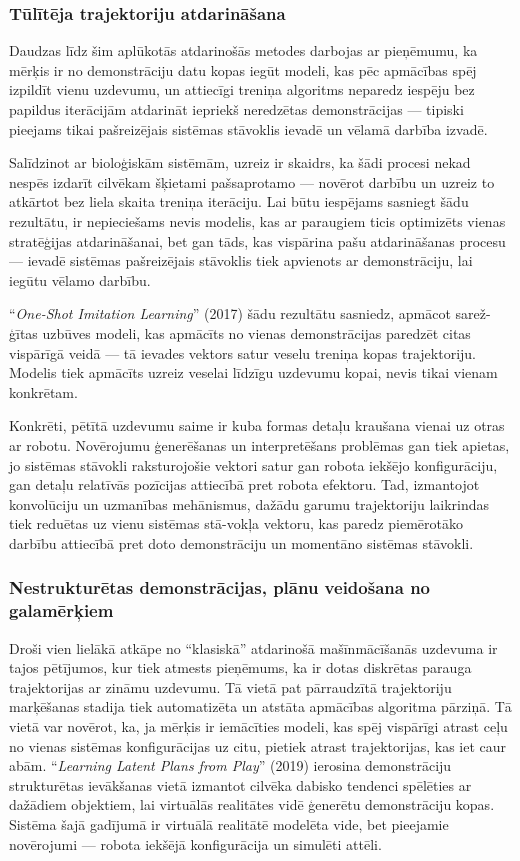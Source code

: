 \documentclass[12pt, a4paper]{article}
\numberwithin{equation}{section} %
\begin{document}
\subsubsection{Tūlītēja trajektoriju atdarināšana}

Daudzas līdz šim aplūkotās atdarinošās metodes darbojas ar pieņēmumu, ka mērķis ir no demonstrāciju datu kopas iegūt modeli, kas pēc apmācības spēj izpildīt vienu uzdevumu, un attiecīgi treniņa algoritms neparedz iespēju bez papildus iterācijām atdarināt iepriekš neredzētas demonstrācijas --- tipiski pieejams tikai pašreizējais sistēmas stāvoklis ievadē un vēlamā darbība izvadē.

Salīdzinot ar bioloģiskām sistēmām, uzreiz ir skaidrs, ka šādi procesi nekad nespēs izdarīt cilvēkam šķietami pašsaprotamo --- novērot darbību un uzreiz to atkārtot bez liela skaita treniņa iterāciju. Lai būtu iespējams sasniegt šādu rezultātu, ir nepieciešams nevis modelis, kas ar paraugiem ticis optimizēts vienas stratēģijas atdarināšanai, bet gan tāds, kas vispārina pašu atdarināšanas procesu --- ievadē sistēmas pašreizējais stāvoklis tiek apvienots ar demonstrāciju, lai iegūtu vēlamo darbību. 

``\textit{One-Shot Imitation Learning}'' \cite{duan2017one} (2017) šādu rezultātu sasniedz, apmācot sarež-ģītas uzbūves modeli, kas apmācīts no vienas demonstrācijas paredzēt citas vispārīgā veidā --- tā ievades vektors satur veselu treniņa kopas trajektoriju. Modelis tiek apmācīts uzreiz veselai līdzīgu uzdevumu kopai, nevis tikai vienam konkrētam.

Konkrēti, pētītā uzdevumu saime ir kuba formas detaļu kraušana vienai uz otras ar robotu. Novērojumu ģenerēšanas un interpretēšans problēmas gan tiek apietas, jo sistēmas stāvokli raksturojošie vektori satur gan robota iekšējo konfigurāciju, gan detaļu relatīvās pozīcijas attiecībā pret robota efektoru. Tad, izmantojot konvolūciju un uzmanības mehānismus, dažādu garumu trajektoriju laikrindas tiek reduētas uz vienu sistēmas stā-vokļa vektoru, kas paredz piemērotāko darbību attiecībā pret doto demonstrāciju un momentāno sistēmas stāvokli.

\subsubsection{Nestrukturētas demonstrācijas, plānu veidošana no galamērķiem}

Droši vien lielākā atkāpe no ``klasiskā'' atdarinošā mašīnmācīšanās uzdevuma ir tajos pētījumos, kur tiek atmests pieņēmums, ka ir dotas diskrētas parauga trajektorijas ar zināmu uzdevumu. Tā vietā pat pārraudzītā trajektoriju marķēšanas stadija tiek automatizēta un atstāta apmācības algoritma pārziņā. Tā vietā var novērot, ka, ja mērķis ir iemācīties modeli, kas spēj vispārīgi atrast ceļu no vienas sistēmas konfigurācijas uz citu, pietiek atrast trajektorijas, kas iet caur abām. ``\textit{Learning Latent Plans from Play}'' \cite{lynch2020learning} (2019) ierosina demonstrāciju strukturētas ievākšanas vietā izmantot cilvēka dabisko tendenci spēlēties ar dažādiem objektiem, lai virtuālās realitātes vidē ģenerētu demonstrāciju kopas. Sistēma šajā gadījumā ir virtuālā realitātē modelēta vide, bet pieejamie novērojumi --- robota iekšējā konfigurācija un simulēti attēli.
\end{document}
